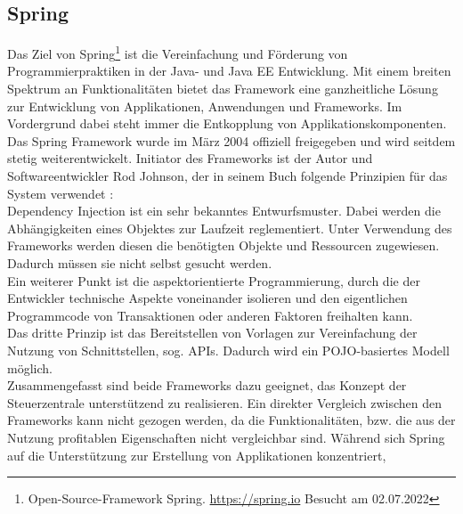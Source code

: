    \subsection{Spring}
    \label{subsec:springBootFramework} 
        Das Ziel von Spring\footnote{Open-Source-Framework Spring. \url{https://spring.io} Besucht am 02.07.2022} 
        ist die Vereinfachung und Förderung von Programmierpraktiken in der Java- und Java EE Entwicklung. Mit einem breiten Spektrum an 
        Funktionalitäten bietet das Framework eine ganzheitliche Lösung zur Entwicklung von Applikationen, Anwendungen und Frameworks. Im Vordergrund dabei steht immer die 
        Entkopplung von Applikationskomponenten. Das Spring Framework wurde im März 2004 offiziell freigegeben und wird seitdem stetig weiterentwickelt. 
        Initiator des Frameworks ist der Autor und Softwareentwickler Rod Johnson, der in seinem Buch folgende Prinzipien für das System verwendet \cite{johnson2004expert}: 
        \\
        \linebreak
        Dependency Injection ist ein sehr bekanntes Entwurfsmuster. Dabei werden die Abhängigkeiten eines Objektes zur Laufzeit reglementiert. Unter 
        Verwendung des Frameworks werden diesen die benötigten Objekte und Ressourcen zugewiesen. Dadurch müssen sie nicht selbst gesucht werden. 
        \\
        \linebreak
        Ein weiterer Punkt ist die aspektorientierte Programmierung, durch die der Entwickler technische Aspekte voneinander isolieren und den eigentlichen Programmcode 
        von Transaktionen oder anderen Faktoren freihalten kann. 
        \\
        \linebreak
        Das dritte Prinzip ist das Bereitstellen von Vorlagen zur Vereinfachung der Nutzung von Schnittstellen, sog. \acs{API}s. Dadurch wird ein \acs{POJO}-basiertes Modell 
        möglich. %
        \\
        \linebreak
        Zusammengefasst sind beide Frameworks dazu geeignet, das Konzept der Steuerzentrale unterstützend zu realisieren. 
        Ein direkter Vergleich zwischen den Frameworks kann nicht gezogen werden, da die Funktionalitäten, bzw. die aus der Nutzung 
        profitablen Eigenschaften nicht vergleichbar sind. Während sich Spring auf die Unterstützung zur Erstellung von Applikationen konzentriert, 
